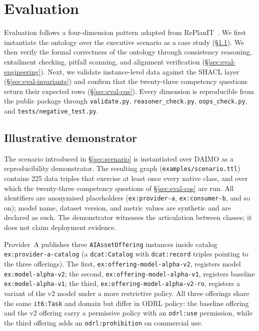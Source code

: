 \documentclass[Afour,sagev,times]{sagej}
\newcommand{\code}[1]{\texttt{#1}}
\begin{document}
\section{Evaluation}\label{sec:eval}

Evaluation follows a four-dimension pattern adapted from RePlanIT~\cite{kurteva}. We first instantiate the ontology over the executive scenario as a case study (§\ref{sec:eval-usecase}). We then verify the formal correctness of the ontology through consistency reasoning, entailment checking, pitfall scanning, and alignment verification (§\ref{sec:eval-engineering}). Next, we validate instance-level data against the SHACL layer (§\ref{sec:eval-invariants}) and confirm that the twenty-three competency questions return their expected rows (§\ref{sec:eval-cqs}). Every dimension is reproducible from the public package through \code{validate.py}, \code{reasoner\_check.py}, \code{oops\_check.py}, and \code{tests/negative\_test.py}.

\subsection{Illustrative demonstrator}\label{sec:eval-usecase}

The scenario introduced in §\ref{sec:scenario} is instantiated over DAIMO as a reproducibility demonstrator. The resulting graph (\code{examples/scenario.ttl}) contains 225 data triples that exercise at least once every native class, and over which the twenty-three competency questions of §\ref{sec:eval-cqs} are run. All identifiers are anonymised placeholders (\code{ex:provider-a}, \code{ex:consumer-b}, and so on); model name, dataset version, and metric values are synthetic and are declared as such. The demonstrator witnesses the articulation between classes; it does not claim deployment evidence.

Provider~A publishes three \code{AIAssetOffering} instances inside catalog \code{ex:provider-a-catalog} (a \code{dcat:Catalog} with \code{dcat:record} triples pointing to the three offerings). The first, \code{ex:offering-model-alpha-v2}, registers model \code{ex:model-alpha-v2}; the second, \code{ex:offering-model-alpha-v1}, registers baseline \code{ex:model-alpha-v1}; the third, \code{ex:offering-model-alpha-v2-ro}, registers a variant of the v2 model under a more restrictive policy. All three offerings share the same \code{it6:Task} and domain but differ in ODRL policy: the baseline offering and the v2 offering carry a permissive policy with an \code{odrl:use} permission, while the third offering adds an \code{odrl:prohibition} on commercial use.
\end{document}
